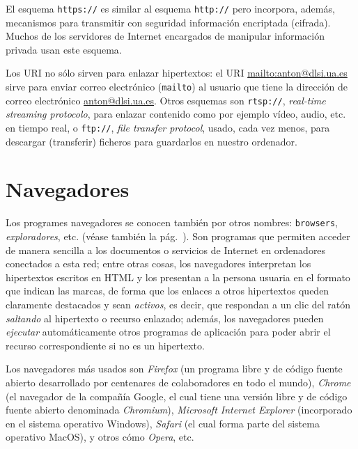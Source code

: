 El esquema {\tt https://} es similar al esquema {\tt http://} pero incorpora, además, mecanismos para transmitir con seguridad información encriptada (cifrada). Muchos de los servidores de Internet encargados de manipular información privada usan este esquema. 

Los URI no sólo sirven para enlazar hipertextos: el URI \url{mailto:anton@dlsi.ua.es} sirve para enviar correo electrónico (\texttt{mailto}) al usuario que tiene la dirección de correo electrónico \url{anton@dlsi.ua.es}. Otros esquemas son \texttt{rtsp://}, \emph{real-time streaming protocolo}, para enlazar contenido como por ejemplo vídeo, audio, etc. en tiempo real, o {\tt ftp://}, \emph{file transfer protocol}, usado, cada vez menos, para descargar (transferir) ficheros para guardarlos en nuestro ordenador\label{pg:ftp}. 

\section{Navegadores} \label{ss:navegadors} Los programes navegadores se conocen también por otros nombres: \texttt{browsers}, \emph{exploradores}, etc. (véase también la pág.~\pageref{pg:navegadors}). Son programas que permiten acceder de manera sencilla a los documentos o servicios de Internet en ordenadores conectados a esta red; entre otras cosas, los navegadores interpretan los hipertextos escritos en HTML y los presentan a la persona usuaria en el formato que indican las marcas, de forma que los enlaces a otros hipertextos queden claramente destacados y sean \emph{activos}, es decir, que respondan a un clic del ratón \emph{saltando} al hipertexto o recurso enlazado; además, los navegadores pueden \emph{ejecutar} automáticamente otros programas de aplicación para poder abrir el recurso correspondiente si no es un hipertexto. 

Los navegadores más usados son \emph{Firefox} (un programa libre y de código fuente abierto desarrollado por centenares de colaboradores en todo el mundo), \emph{Chrome} (el navegador de la compañía Google, el cual tiene una versión libre y de código fuente abierto denominada \emph{Chromium}), \emph{Microsoft Internet Explorer} (incorporado en el sistema operativo Windows), \emph{Safari} (el cual forma parte del sistema operativo MacOS), y otros cómo \emph{Opera}, etc. 


